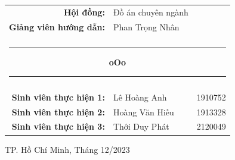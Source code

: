 \begin{titlepage}
    \vspace{1.5cm}

    \begingroup
        \fontsize{14pt}{12pt}\selectfont
        \begin{center}
            \begin{tabular}{rll}
                \color{black} \textbf{Hội đồng:} & \color{black} Đồ án chuyên ngành &  \\
                \color{black} \textbf{Giảng viên hướng dẫn:} & \color{black} Phan Trọng Nhân &  \\

                \\

                \multicolumn{3}{c}{\noindent\rule{4cm}{0.5pt} \textbf{oOo} \noindent\rule{4cm}{0.5pt}} \\ \\
                \color{black}\textbf{Sinh viên thực hiện 1:} & \color{black}Lê Hoàng Anh & \color{black}1910752 \\
                \color{black}\textbf{Sinh viên thực hiện 2:} & \color{black}Hoàng Văn Hiếu & \color{black}1913328 \\
                \color{black}\textbf{Sinh viên thực hiện 3:} & \color{black}Thới Duy Phát & \color{black}2120049 \\
            \end{tabular}
        \end{center}
    \endgroup
    
    \vspace{1.5cm}

    \begingroup
        \fontsize{12pt}{12pt}\selectfont
        \begin{center}
            {TP. Hồ Chí Minh, Tháng 12/2023}
        \end{center}
    \endgroup
    
\end{titlepage}